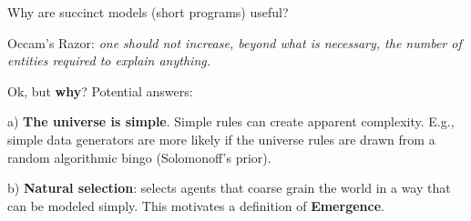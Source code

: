 



\begin{frame}[label=ladila]{Why are succinct models (short programs) useful?}

Occam’s Razor\cite{Ruffini:2007aa,Ruffini:2009aa,Ruffini2017}: {\em
one should not increase, beyond what is necessary, the number of entities required to explain anything.}  \vfill

Ok, but \textbf{why}? Potential answers:\vfill

a) \textbf{The universe is simple}. Simple rules can create apparent complexity. E.g., simple data generators are more likely if the universe rules are drawn from a random algorithmic bingo (Solomonoff's prior).\vfill


 
b) \textbf{Natural selection}: selects agents that coarse grain the world in a way that can be modeled simply. This motivates a definition of \textbf{Emergence}.

 
\end{frame}

